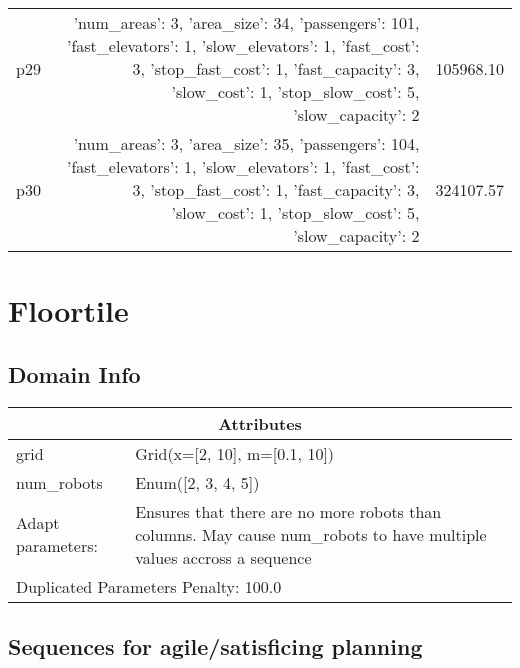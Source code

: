 \documentclass{article}
\begin{document}
\begin{center}
\begin{tabular}{@{}l|r|r@{}}
  p29&{'num\_areas': 3, 'area\_size': 34, 'passengers': 101, 'fast\_elevators': 1, 'slow\_elevators': 1, 'fast\_cost': 3, 'stop\_fast\_cost': 1, 'fast\_capacity': 3, 'slow\_cost': 1, 'stop\_slow\_cost': 5, 'slow\_capacity': 2}&105968.10\\
  p30&{'num\_areas': 3, 'area\_size': 35, 'passengers': 104, 'fast\_elevators': 1, 'slow\_elevators': 1, 'fast\_cost': 3, 'stop\_fast\_cost': 1, 'fast\_capacity': 3, 'slow\_cost': 1, 'stop\_slow\_cost': 5, 'slow\_capacity': 2}&324107.57
                            \end{tabular}
                            \end{center}
                    
                            \newpage \section{Floortile}
                    \subsection*{Domain Info}

                    \begin{center}
                    \begin{tabular}{@{}p{}p{}@{}}
                    \multicolumn{2}{c}{\bf \large Attributes}\\\midrule
                    grid & Grid(x=[2, 10], m=[0.1, 10])\\
num\_robots & Enum([2, 3, 4, 5])
                    
                    \\\midrule
                    Adapt parameters: & Ensures that there are no more robots than columns. May cause num\_robots to have multiple values accross a sequence
                
                     \\\midrule
                    \multicolumn{2}{l}{Duplicated Parameters Penalty: 100.0}
                    \end{tabular}
                    \end{center}
                
                         \subsection*{Sequences for agile/satisficing planning}
\end{document}
